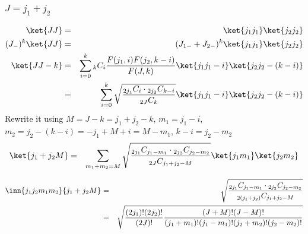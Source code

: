 \documentclass{article}
\begin{document}
\subsubsection{$J=j_1+j_2$}
\label{sec-4-3-1}
\begin{eqnarray}
\ket{JJ} & = & \ket{j_1j_1}\ket{j_2j_2} \\
(J_{-})^k\ket{JJ} & = &(J_{1-}+J_{2-})^k \ket{j_1j_1}\ket{j_2j_2} \\ 
\ket{JJ-k} & = &\sum_{i=0}^{k} {}_{k}C_{i}\frac{ F(j_1,i)F(j_2,k-i)}{F(J,k)} \ket{j_1j_1-i}\ket{j_2j_2-(k-i)} \\ 
           & = &\sum_{i=0}^{k} \sqrt{\frac{ {}_{2j_1}C_{i}\cdot {}_{2j_2}C_{k-i}}{{}_{2J}C_{k}}} \ket{j_1j_1-i}\ket{j_2j_2-(k-i)}
\end{eqnarray}
Rewrite it using $M= J-k= j_1 +j_2 -k$, $m_1 = j_1 - i$, $m_2= j_2 - (k-i) = -j_1 +M +i = M - m_1$, $k-i= j_2 -m_2$
\begin{eqnarray}
\ket{j_1+j_2M}  & = &\sum_{m_1 +m_2=M} \sqrt{\frac{ {}_{2j_1}C_{j_1 -m_1}\cdot {}_{2j_2}C_{j_2-m_2}}{{}_{2J}C_{j_1 +j_2 -M}}} \ket{j_1m_1}\ket{j_2m_2}
\end{eqnarray}

\begin{eqnarray}
\inn{j_1j_2m_1m_2}{j_1+j_2M}  & = & \sqrt{\frac{ {}_{2j_1}C_{j_1 -m_1}\cdot {}_{2j_2}C_{j_2-m_2}}{{}_{2(j_1+j_2)}C_{j_1 +j_2 -M}}} \\
                                                                & = & \sqrt{\frac{(2j_1)!(2j_2)! }{(2J)!} \frac{(J+M)!(J-M)!}{(j_1+m_1)!(j_1-m_1)!(j_2+m_2)!(j_2-m_2)!}} 
\end{eqnarray}
\end{document}
